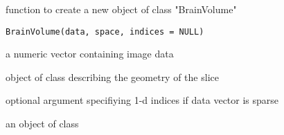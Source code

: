 \begin{Description}\relax
function to create a new object of class "BrainVolume"
\end{Description}
\begin{Usage}
\begin{verbatim}
BrainVolume(data, space, indices = NULL)
\end{verbatim}
\end{Usage}
\begin{Arguments}
\begin{ldescription}
\item[\code{data}] a numeric vector containing image data 
\item[\code{space}] object of class  describing the
geometry of the slice 
\item[\code{indices}] optional argument specifiying 1-d indices if data
vector is sparse 
\end{ldescription}
\end{Arguments}
\begin{Value}
an object of class 
\end{Value}

